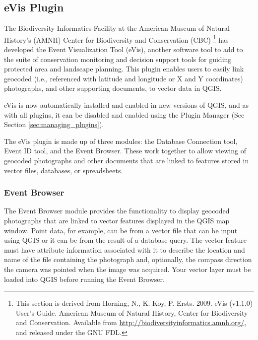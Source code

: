 
\subsection{eVis Plugin}\label{sec:evis}

The Biodiversity Informatics Facility at the American Museum of Natural History's (AMNH) Center 
for Biodiversity and Conservation (CBC) \footnote{This section is derived from Horning, N., K.
Koy, P. Ersts. 2009. eVis (v1.1.0) User's Guide. American Museum of
Natural History, Center for Biodiversity and Conservation. Available from
\url{http://biodiversityinformatics.amnh.org/}, and released under the GNU FDL.} has developed the
Event Visualization Tool (eVis), 
another software tool to add to the suite of conservation monitoring and decision support tools 
for guiding protected area and landscape planning. This plugin enables users to easily link 
geocoded (i.e., referenced with latitude and longitude or X and Y coordinates) photographs, 
and other supporting documents, to vector data in QGIS.

eVis is now automatically installed and enabled in new versions of QGIS, and as with all plugins, 
it can be disabled and enabled using the Plugin Manager (See Section \ref{sec:managing_plugins}).

The eVis plugin is made up of three modules: the Database Connection tool, Event ID tool, and 
the Event Browser. These work together to allow viewing of geocoded photographs and other documents 
that are linked to features stored in vector files, databases, or spreadsheets.

\subsubsection{Event Browser}\label{evis_browser}

The Event Browser module provides the functionality to display geocoded photographs that are linked
to vector features displayed in the QGIS map window. Point data, for example, can be from a vector
file that can be input using QGIS or it can be from the result of a database query. The vector
feature must have attribute information associated with it to describe the location and name of the
file containing the photograph and, optionally, the compass direction the camera was pointed when
the image was acquired. Your vector layer must be loaded into QGIS before running the Event Browser.

